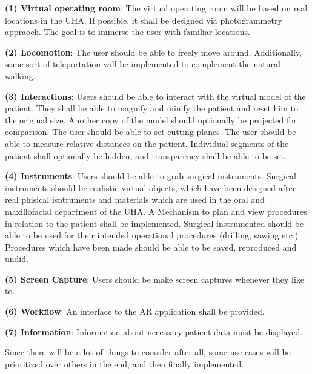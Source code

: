 \begin{compactenum}[label=(\alph*)]
    \item \textbf{(1) Virtual operating room}: The virtual operating room will be based on real locations in the UHA.
    If possible, it shall be designed via photogrammetry appraoch. The goal is to immerse the user with familiar locations.
    \item \textbf{(2) Locomotion}: The user should be able to freely move around.
    Additionally, some sort of teleportation will be implemented to complement the natural walking.
    \item \textbf{(3) Interactions}: Users should be able to interact with the virtual model of the patient.
    They shall be able to magnify and minify the patient and reset him to the original size.
    Another copy of the model should optionally be projected for comparison.
    The user should be able to set cutting planes.
    The user should be able to measure relative distances on the patient.
    Individual segments of the patient shall optionally be hidden, and transparency shall be able to be set.
    \item \textbf{(4) Instruments}: Users should be able to grab surgical instruments.
    Surgical instruments should be realistic virtual objects, which have been designed after real phisical isntruments and materials which are used in the oral and maxillofacial department of the UHA.
    A Mechanism to plan and view procedures in relation to the patient shall be implemented.
    Surgical instrumented should be able to be used for their intended operational procedures (drilling, sawing etc.)
    Procedures which have been made should be able to be saved, reproduced and undid.
    \item \textbf{(5) Screen Capture}: Users should be make screen captures whenever they like to.
    \item \textbf{(6) Workflow}: An interface to the AR application shall be provided.
    \item \textbf{(7) Information}: Information about necessary patient data must be displayed.
\end{compactenum}

Since there will be a lot of things to consider after all, some use cases will be prioritized over others in the end, and then finally implemented.